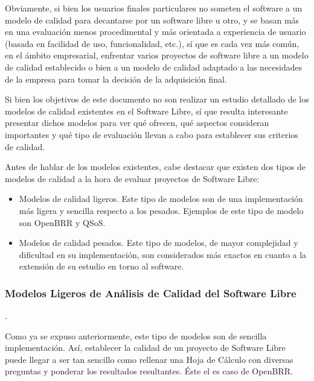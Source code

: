\documentclass[11pt]{article}
\begin{document}
Obviamente, si bien los usuarios finales particulares no someten el software a un modelo de calidad para decantarse por un software libre u otro, y se basan más en una evaluación menos procedimental y más orientada a experiencia de usuario (basada en facilidad de uso, funcionalidad, etc.), sí que es cada vez más común, en el ámbito empresarial, enfrentar varios proyectos de software libre a un modelo de calidad establecido o bien a un modelo de calidad adaptado a las necesidades de la empresa para tomar la decisión de la adquisición final.

Si bien los objetivos de este documento no son realizar un estudio detallado de los modelos de calidad existentes en el Software Libre, sí que resulta interesante presentar dichos modelos para ver qué ofrecen, qué aspectos consideran importantes y qué tipo de evaluación llevan a cabo para establecer sus criterios de calidad.

Antes de hablar de los modelos existentes, cabe destacar que existen dos tipos de modelos de calidad a la hora de evaluar proyectos de Software Libre:

\begin{itemize}
\item{Modelos de calidad ligeros}. Este tipo de modelos son de una implementación más ligera y sencilla respecto a los pesados. Ejemplos de este tipo de modelo son OpenBRR y QSoS.
\item{Modelos de calidad pesados}. Este tipo de modelos, de mayor complejidad y dificultad en su implementación, son considerados más exactos en cuanto a la extensión de su estudio en torno al software.
\end{itemize}

\subsubsection{Modelos Ligeros de Análisis de Calidad del Software Libre}.

Como ya se expuso anteriormente, este tipo de modelos son de sencilla implementación. Así, establecer la calidad de un proyecto de Software Libre puede llegar a ser tan sencillo como rellenar una Hoja de Cálculo con diversas preguntas y ponderar los resultados resultantes. Éste el es caso de OpenBRR.
\end{document}
